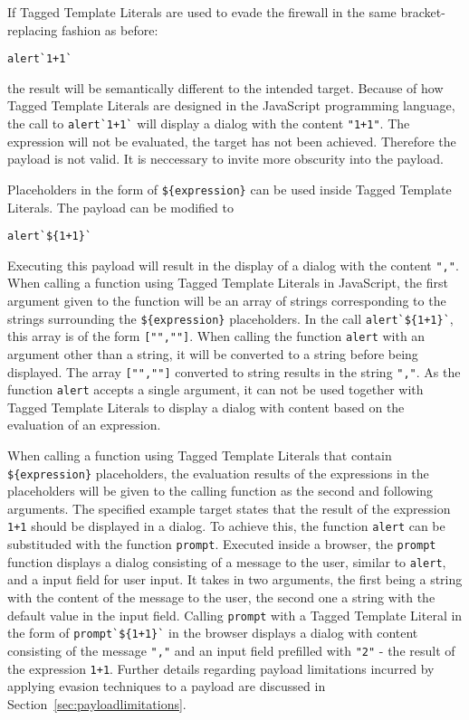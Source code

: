 If Tagged Template Literals are used to evade the firewall in the same bracket-replacing fashion as before: 
\begin{lstlisting}[style=basicStyle]
alert`1+1`
\end{lstlisting}
the result will be semantically different to the intended target.
Because of how Tagged Template Literals are designed in the JavaScript programming language, the call to \verb|alert`1+1`| will display a dialog with the content \verb|"1+1"|. The expression will not be evaluated, the target has not been achieved. Therefore the payload is not valid. It is neccessary to invite more obscurity into the payload. 

Placeholders in the form of \verb|${expression}| can be used inside Tagged Template Literals. The payload can be modified to 
\begin{lstlisting}[style=basicStyle]
alert`${1+1}`
\end{lstlisting}
Executing this payload will result in the display of a dialog with the content \verb|","|. When calling a function using Tagged Template Literals in JavaScript, the first argument given to the function will be an array of strings corresponding to the strings surrounding the \verb|${expression}| placeholders. In the call \verb|alert`${1+1}`|, this array is of the form \verb|["",""]|. When calling the function \verb|alert| with an argument other than a string, it will be converted to a string before being displayed. The array \verb|["",""]| converted to string results in the string \verb|","|. 
As the function \verb|alert| accepts a single argument, it can not be used together with Tagged Template Literals to display a dialog with content based on the evaluation of an expression.

When calling a function using Tagged Template Literals that contain \verb|${expression}| placeholders, the evaluation results of the expressions in the placeholders will be given to the calling function as the second and following arguments.
The specified example target states that the result of the expression \verb|1+1| should be displayed in a dialog.
To achieve this, the function \verb|alert| can be substituded with the function \verb|prompt|. Executed inside a browser, the \verb|prompt| function displays a dialog consisting of a message to the user, similar to \verb|alert|, and a input field for user input. It takes in two arguments, the first being a string with the content of the message to the user, the second one a string with the default value in the input field. 
Calling \verb|prompt| with a Tagged Template Literal in the form of \verb|prompt`${1+1}`| in the browser displays a dialog with content consisting of the message \verb|","| and an input field prefilled with \verb|"2"| - the result of the expression \verb|1+1|.  
Further details regarding payload limitations incurred by applying evasion techniques to a payload are discussed in Section~\ref{sec:payloadlimitations}.

